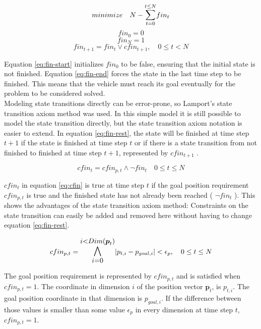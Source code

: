 \begin{equation}
\label{eq:goal-fun}
minimize \quad N - \mathlarger{\sum}_{t=0}^{t \leq N} fin_t
\end{equation}
\begin{equation}
\label{eq:fin-start}
fin_0 = 0
\end{equation}
\begin{equation}
\label{eq:fin-end}
fin_{N} = 1
\end{equation}
\begin{equation}
\label{eq:fin-rest}
fin_{t+1} = fin_t \vee cfin_{t+1},  \quad 0 \leq t < N
\end{equation}

Equation \ref{eq:fin-start} initializes $fin_0$ to be false, ensuring that the initial state is not finished. Equation \ref{eq:fin-end} forces the state in the last time step to be finished. This means that the vehicle must reach its goal eventually for the problem to be considered solved. \\
Modeling state transitions directly can be error-prone, so Lamport's \cite{Lamport1989} state transition axiom method was used. In this simple model it is still possible to model the state transition directly, but the state transition axiom notation is easier to extend. In equation \ref{eq:fin-rest}, the state will be finished at time step $t+1$ if the state is finished at time step $t$ or if there is a state transition from not finished to finished at time step $t + 1$, represented by $cfin_{t+1}$ .

\begin{equation}
\label{eq:cfin}
cfin_t =  cfin_{p,t} \wedge \neg fin_t\quad 0 \leq t \leq N
\end{equation}

 $cfin_t$ in equation \ref{eq:cfin} is true at time step $t$ if the goal position requirement $cfin_{p,t}$ is true and the finished state has not already been reached ( $ \neg fin_t$ ). This shows the advantages of the state transition axiom method: Constraints on the state transition can easily be added and removed here without having to change equation \ref{eq:fin-rest}.

\begin{equation}
\label{eq:cfin-p}
cfin_{p,t} =  \mathlarger{\mathlarger{\bigwedge_{i = 0}^{i < Dim(\boldsymbol{p}_t)}}} |p_{t,i} - p_{goal, i}| < \epsilon_{p},  \quad 0 \leq t \leq N
\end{equation}

The goal position requirement is represented by $cfin_{p,t}$ and is satisfied when $cfin_{p,t} = 1$. The coordinate in dimension $i$ of the position vector $\boldsymbol{p}_t$, is $p_{t,i}$. The goal position coordinate in that dimension is $p_{goal, i}$. If the difference between those values is smaller than some value $\epsilon_p$ in every dimension at time step $t$,  $cfin_{p,t} = 1$.

